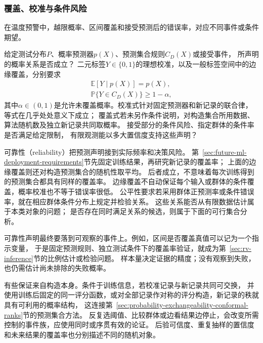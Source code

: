 \subsubsection{覆盖、校准与条件风险}
\label{sec:future-analysis-reliability}

在温度预警中，越限概率、区间覆盖和接受预测后的错误率，对应不同事件或条件期望。

\begin{mathproblem}[预测与决策的概率关系是否满足要求]
  \label{question:future-reliability}
  给定测试分布$P$、概率预测器$p(X)$、预测集合规则$C_D(X)$或接受事件，
  所声明的概率关系是否成立？
  二元标签$Y\in\{0,1\}$的理想校准，以及一般标签空间中的边缘覆盖，分别要求
  \[
    \begin{gathered}
      \mathbb E[Y\mid p(X)]=p(X),\\
      \mathbb P\{Y\in C_D(X)\}\geq1-\alpha,
    \end{gathered}
  \]
  其中$\alpha\in(0,1)$是允许未覆盖概率。校准式针对固定预测器和新记录的联合律，等式在几乎处处意义下成立；
  覆盖式若未另作条件说明，对构造集合所用数据、算法随机数及独立新记录共同取概率。
  接受部分的条件风险、指定群体的条件率是否满足给定限制，
  有限观测能以多大置信度支持这些声明？
\end{mathproblem}

可靠性（reliability）把预测声明接到实际频率和决策风险。
第~\ref{sec:future-ml-deployment-requirements}节先固定训练结果，再研究新记录的覆盖率；
上面的边缘覆盖则还对构造预测集合的随机性取平均。
后者成立，不意味着每次训练得到的预测集合都具有同样的覆盖率。
边缘覆盖不自动保证每个输入或群体的条件覆盖，概率校准也不等于错误率很低。
公平性要求若采用群体正预测率或条件错误率，就在相应群体条件分布上规定并检验关系。
这些关系能否从有限数据估计属于本类对象的问题；
是否存在同时满足关系的候选，则属于下面的可行集合分析。

可靠性声明最终要落到可观察的事件上。例如，区间是否覆盖真值可以记为一个指示变量，
于是固定预测规则、独立测试条件下的覆盖率验证，就成为第~\ref{sec:rv-inference}节的比例估计或检验问题。
样本量决定证据的精度；没有观察到失败，也仍需估计尚未排除的失败概率。

有些保证来自构造本身。条件于训练信息，若校准记录与新记录共同可交换，
并使用训练后固定的同一评分函数，或对全部记录作对称的评分构造，新记录的秩就具有可利用的概率结构，
这连接第~\ref{sec:probability-exchangeability-conformal-ranks}节的预测集合方法。
反复选阈值、比较群体或边看结果边停止，会改变所需控制的事件族，应使用同时或序贯有效的论证。
后验可信度、重复抽样的置信度和未来结果的覆盖率也分别描述不同的随机对象。

